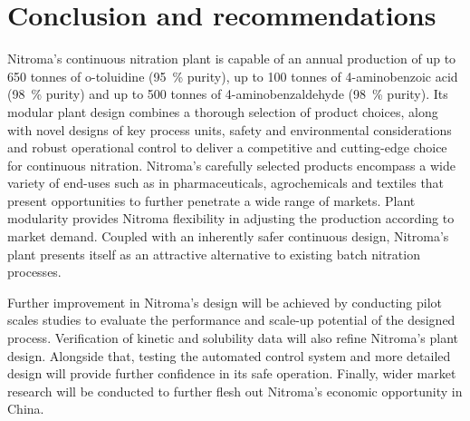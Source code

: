\section*{Conclusion and recommendations}
Nitroma's continuous nitration plant is capable of an annual production of up to 650 tonnes of o-toluidine (\SI{95}{\percent} purity), up to 100 tonnes of 4-aminobenzoic acid (\SI{98}{\percent} purity) and up to 500 tonnes of 4-aminobenzaldehyde (\SI{98}{\percent} purity). Its modular plant design combines a thorough selection of product choices, along with novel designs of key process units, safety and environmental considerations and robust operational control to deliver a competitive and cutting-edge choice for continuous nitration. Nitroma's carefully selected products encompass a wide variety of end-uses such as in pharmaceuticals, agrochemicals and textiles that present opportunities to further penetrate a wide range of markets. Plant modularity provides Nitroma flexibility in adjusting the production according to market demand. Coupled with an inherently safer continuous design, Nitroma's plant presents itself as an attractive alternative to existing batch nitration processes.

Further improvement in Nitroma's design will be achieved by conducting pilot scales studies to evaluate the performance and scale-up potential of the designed process. Verification of kinetic and solubility data will also refine Nitroma's plant design. Alongside that, testing the automated control system and more detailed design will provide further confidence in its safe operation. Finally, wider market research will be conducted to further flesh out Nitroma's economic opportunity in China.


